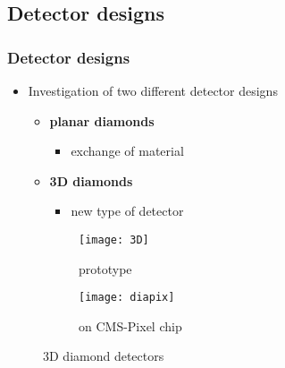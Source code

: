 \subsection{Detector designs}
\begin{frame}
	\frametitle{Detector designs}
	\begin{itemize}
		\item Investigation of two different detector designs
		\vspace*{5pt}
		\begin{itemize}
			\item \textbf{planar diamonds}
			\begin{itemize}
				\item exchange of material
			\end{itemize}
			\item \textbf{3D diamonds}
			\begin{itemize}
				\item new type of detector
			\end{itemize}
		\end{itemize}
	\end{itemize}
	\begin{figure}[htbp] 
		\begin{center}
			\begin{subfigure}{0.45\textwidth}  
				\centering 
				\texttt{[image: 3D]}
				\caption{prototype}
			\end{subfigure}
			\begin{subfigure}{0.45\textwidth} 
				\centering 
				\texttt{[image: diapix]}
				\caption{on CMS-Pixel chip} 	
			\end{subfigure} 
			\caption{3D diamond detectors} 
		\end{center}
	\end{figure}
\end{frame}
